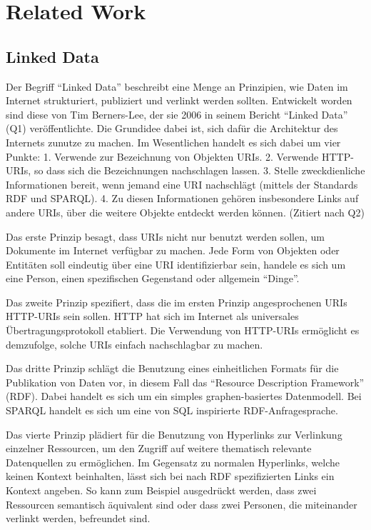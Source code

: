 \section{Related Work}


\subsection{Linked Data}

Der Begriff “Linked Data” beschreibt eine Menge an Prinzipien, wie Daten im Internet strukturiert, publiziert und verlinkt werden sollten. Entwickelt worden sind diese von Tim Berners-Lee, der sie 2006 in seinem Bericht “Linked Data” (Q1) veröffentlichte. Die Grundidee dabei ist, sich dafür die Architektur des Internets zunutze zu machen. Im Wesentlichen handelt es sich dabei um vier Punkte:
1. Verwende zur Bezeichnung von Objekten URIs.
2. Verwende HTTP-URIs, so dass sich die Bezeichnungen nachschlagen lassen.
3. Stelle zweckdienliche Informationen bereit, wenn jemand eine URI nachschlägt (mittels der Standards RDF und SPARQL).
4. Zu diesen Informationen gehören insbesondere Links auf andere URIs, über die weitere Objekte entdeckt werden können.
(Zitiert nach Q2)


Das erste Prinzip besagt, dass URIs nicht nur benutzt werden sollen, um Dokumente im Internet verfügbar zu machen. Jede Form von Objekten oder Entitäten soll eindeutig über eine URI identifizierbar sein, handele es sich um eine Person, einen spezifischen Gegenstand oder allgemein “Dinge”.


Das zweite Prinzip spezifiert, dass die im ersten Prinzip angesprochenen URIs HTTP-URIs sein sollen. HTTP hat sich im Internet als universales Übertragungsprotokoll etabliert. Die Verwendung von HTTP-URIs ermöglicht es demzufolge, solche URIs einfach nachschlagbar zu machen.


Das dritte Prinzip schlägt die Benutzung eines einheitlichen Formats für die Publikation von Daten vor, in diesem Fall das “Resource Description Framework” (RDF). Dabei handelt es sich um ein simples graphen-basiertes Datenmodell. Bei SPARQL handelt es sich um eine von SQL inspirierte RDF-Anfragesprache.


Das vierte Prinzip plädiert für die Benutzung von Hyperlinks zur Verlinkung einzelner Ressourcen, um den Zugriff auf weitere thematisch relevante Datenquellen zu ermöglichen. Im Gegensatz zu normalen Hyperlinks, welche keinen Kontext beinhalten, lässt sich bei nach RDF spezifizierten Links ein Kontext angeben. So kann zum Beispiel ausgedrückt werden, dass zwei Ressourcen semantisch äquivalent sind oder dass zwei Personen, die miteinander verlinkt werden, befreundet sind.



